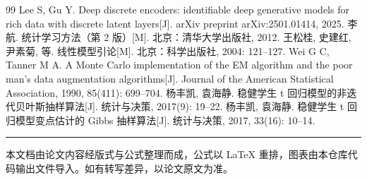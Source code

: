 \documentclass[12pt,a4paper]{ctexart}
\numberwithin{figure}{section}
\numberwithin{table}{section}
\begin{document}
\begin{thebibliography}{99}
   Lee S, Gu Y. Deep discrete encoders: identifiable deep generative models for rich data with discrete latent layers[J]. arXiv preprint arXiv:2501.01414, 2025.
   李航. 统计学习方法（第 2 版）[M]. 北京：清华大学出版社, 2012.
   王松桂, 史建红, 尹素菊, 等. 线性模型引论[M]. 北京：科学出版社, 2004: 121--127.
   Wei G C, Tanner M A. A Monte Carlo implementation of the EM algorithm and the poor man's data augmentation algorithms[J]. Journal of the American Statistical Association, 1990, 85(411): 699--704.
   杨丰凯, 袁海静. 稳健学生 t 回归模型的非迭代贝叶斯抽样算法[J]. 统计与决策, 2017(9): 19--22.
   杨丰凯, 袁海静. 稳健学生 t 回归模型变点估计的 Gibbs 抽样算法[J]. 统计与决策, 2017, 33(16): 10--14.
\end{thebibliography}

\par\noindent\rule{\linewidth}{0.4pt}\par

{\small 本文档由论文内容经版式与公式整理而成，公式以 LaTeX 重排，图表由本仓库代码输出文件导入。如有转写差异，以论文原文为准。}
\end{document}
